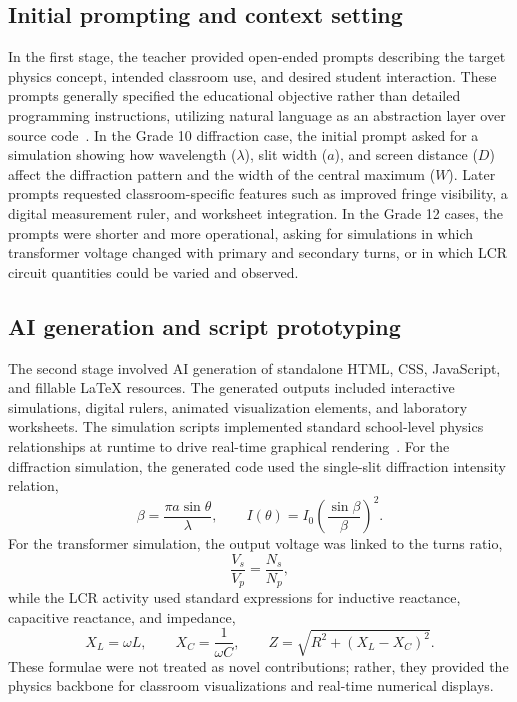 \documentclass{iopjournal}
\begin{document}
\subsection{Initial prompting and context setting}

In the first stage, the teacher provided open-ended prompts describing the target physics concept, intended classroom use, and desired student interaction. These prompts generally specified the educational objective rather than detailed programming instructions, utilizing natural language as an abstraction layer over source code~\cite{suh2023}. In the Grade 10 diffraction case, the initial prompt asked for a simulation showing how wavelength ($\lambda$), slit width ($a$), and screen distance ($D$) affect the diffraction pattern and the width of the central maximum ($W$). Later prompts requested classroom-specific features such as improved fringe visibility, a digital measurement ruler, and worksheet integration. In the Grade 12 cases, the prompts were shorter and more operational, asking for simulations in which transformer voltage changed with primary and secondary turns, or in which LCR circuit quantities could be varied and observed.

\subsection{AI generation and script prototyping}

The second stage involved AI generation of standalone HTML, CSS, JavaScript, and fillable \LaTeX{} resources. The generated outputs included interactive simulations, digital rulers, animated visualization elements, and laboratory worksheets. The simulation scripts implemented standard school-level physics relationships at runtime to drive real-time graphical rendering~\cite{Rutten2012}. For the diffraction simulation, the generated code used the single-slit diffraction intensity relation,
\begin{equation}
\beta = \frac{\pi a \sin\theta}{\lambda}, \qquad I(\theta) = I_0 \left(\frac{\sin\beta}{\beta}\right)^2 .
\end{equation}
For the transformer simulation, the output voltage was linked to the turns ratio,
\begin{equation}
\frac{V_s}{V_p}=\frac{N_s}{N_p},
\end{equation}
while the LCR activity used standard expressions for inductive reactance, capacitive reactance, and impedance,
\begin{equation}
X_L=\omega L, \qquad X_C=\frac{1}{\omega C}, \qquad Z=\sqrt{R^2+(X_L-X_C)^2}.
\end{equation}
These formulae were not treated as novel contributions; rather, they provided the physics backbone for classroom visualizations and real-time numerical displays.
\end{document}
